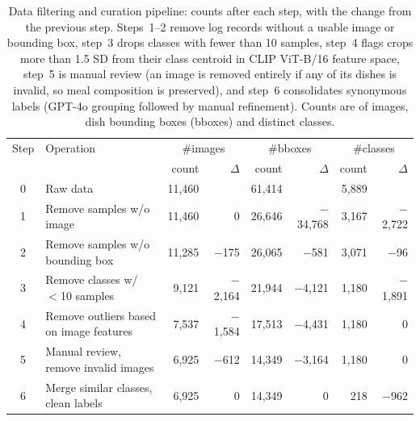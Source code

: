 \begin{table}[tb]
  \centering
  \caption{Data filtering and curation pipeline: counts after each step, with the change from the previous step. Steps~1--2 remove log records without a usable image or bounding box, step~3 drops classes with fewer than 10 samples, step~4 flags crops more than 1.5 SD from their class centroid in CLIP ViT-B/16 feature space, step~5 is manual review (an image is removed entirely if any of its dishes is invalid, so meal composition is preserved), and step~6 consolidates synonymous labels (GPT-4o grouping followed by manual refinement). Counts are of images, dish bounding boxes (bboxes) and distinct classes.}
  \begin{tabular}{@{}cl rr rr rr@{}}
    \toprule
    Step & Operation & \multicolumn{2}{c}{\#images} & \multicolumn{2}{c}{\#bboxes} & \multicolumn{2}{c}{\#classes} \\
    & & count & $\Delta$ & count & $\Delta$ & count & $\Delta$ \\
    \midrule
    0 & Raw data & 11,460 &  & 61,414 &  & 5,889 &  \\
    1 & Remove samples w/o image & 11,460 & 0 & 26,646 & $-$34,768 & 3,167 & $-$2,722 \\
    2 & Remove samples w/o bounding box & 11,285 & $-$175 & 26,065 & $-$581 & 3,071 & $-$96 \\
    3 & Remove classes w/ $<$10 samples & 9,121 & $-$2,164 & 21,944 & $-$4,121 & 1,180 & $-$1,891 \\
    4 & Remove outliers based on image features & 7,537 & $-$1,584 & 17,513 & $-$4,431 & 1,180 & 0 \\
    5 & Manual review, remove invalid images & 6,925 & $-$612 & 14,349 & $-$3,164 & 1,180 & 0 \\
    6 & Merge similar classes, clean labels & 6,925 & 0 & 14,349 & 0 & 218 & $-$962 \\
    \bottomrule
  \end{tabular}
  \label{data cleaning steps table}
\end{table}
